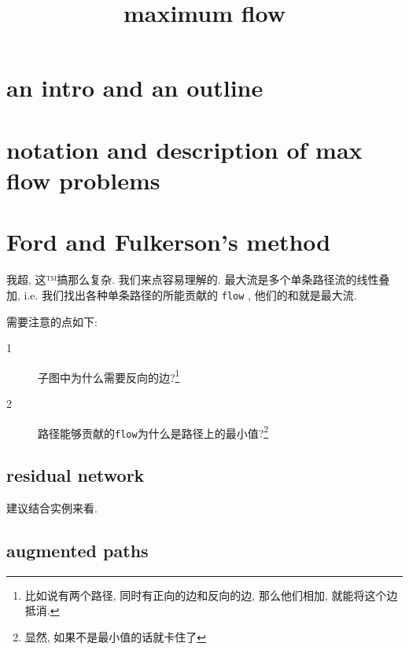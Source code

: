 \documentclass[a4paper, 10pt]{ctexart} %
\title{maximum flow}
\begin{document}
\tableofcontents
\maketitle
\section{an intro and an outline}
\section{notation and description of max flow problems}

\section{Ford and Fulkerson's method}

我超, 这™搞那么复杂. 我们来点容易理解的. 
最大流是多个单条路径流的线性叠加, i.e. 我们找出各种单条路径的所能贡献的 \verb|flow| ,
他们的和就是最大流.

需要注意的点如下: 

\begin{description}
    \item[1] 子图中为什么需要反向的边?\footnote{比如说有两个路径, 同时有正向的边和反向的边, 那么他们相加, 就能将这个边抵消.}
    \item[2] 路径能够贡献的\verb|flow|为什么是路径上的最小值?\footnote{显然, 如果不是最小值的话就卡住了}
\end{description}

\subsection{residual network}

建议结合实例来看.

\subsection{augmented paths}
\end{document}
